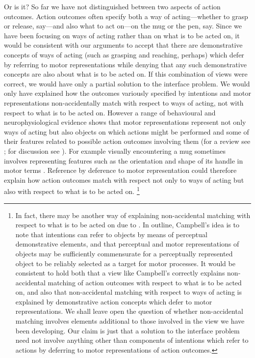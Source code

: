 \documentclass[12pt,\papersize]{extarticle}
\begin{document}
Or is it? So far we have not distinguished between two aspects of action outcomes.  Action outcomes often specify both a way of acting---whether to grasp or release, say---and also what to act on---on the mug or the pen, say.  Since we have been focusing on ways of acting rather than on what is to be acted on, it would be consistent with our arguments to accept that there are demonstrative concepts of ways of acting (such as grasping and reaching, perhaps) which defer by referring to motor representations while denying that any such demonstrative concepts are also about what is to be acted on. If this combination of views were correct, we would have only a partial solution to the interface problem. We would only have explained how the outcomes variously specified by intentions and motor representations non-accidentally match with respect to ways of acting, not with respect to what is to be acted on. However a range of behavioural and neurophysiological evidence shows that motor representations represent not only ways of acting but also objects on which actions might be performed and some of their features related to possible action outcomes involving them (for a review see \citealp{Gallese:2011uq}; for discussion see \citealp[pp.\ 410-3]{pacherie:2000_content}). For example visually encountering a mug sometimes involves representing features such as the orientation and shape of its handle in motor terms \citep{buccino:2009_broken,costantini:2010_where,cardellicchio:2011_space,Tucker:1998,tucker:2001_potentiation}. Reference by deference to motor representation could therefore explain how action outcomes match with respect not only to ways of acting but also with respect to what is to be acted on.%
\footnote{
\label{fn:campbell_location}%
In fact, there may be another way of explaining non-accidental matching with respect to what is to be acted on due to \citet[pp.\ 36-8, 44-5, 48-57]{Campbell:2002ge}. In outline, Campbell's idea is to note that intentions can refer to objects by means of perceptual demonstrative elements, and that perceptual and motor representations of objects may be sufficiently commensurate for a perceptually represented object to be reliably selected as a target for motor processes.  It would be consistent to hold both that a view like Campbell's correctly explains non-accidental matching of action outcomes with respect to what is to be acted on, and also that non-accidental matching with respect to ways of acting is explained by demonstrative action concepts which defer to motor representations. We shall leave open the question of whether non-accidental matching involves elements additional to those involved in the view we have been developing.  Our claim is just that a solution to the interface problem need not involve anything other than components of intentions which refer to actions by deferring to motor representations of action outcomes.
}
\end{document}
